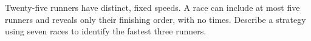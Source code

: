 Twenty-five runners have distinct, fixed speeds. A race can include at most five runners and reveals only their finishing order, with no times. Describe a strategy using seven races to identify the fastest three runners.
